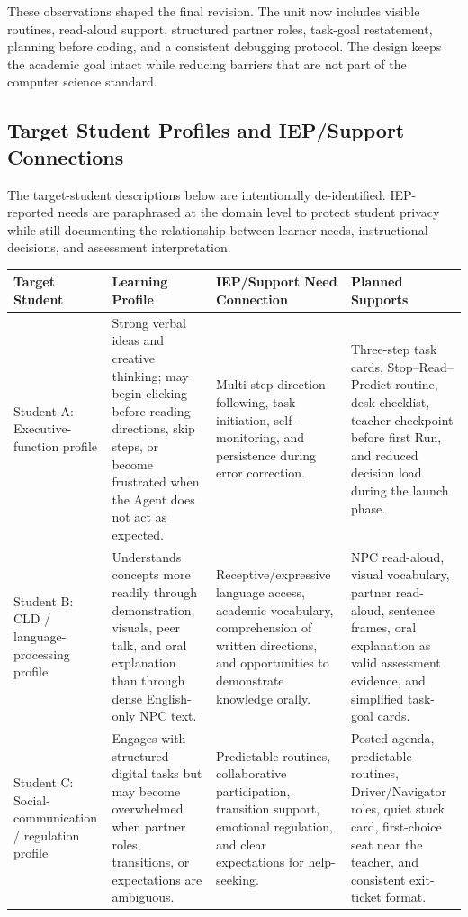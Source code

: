 \documentclass[12pt]{article}
\begin{document}
These observations shaped the final revision. The unit now includes visible routines, read-aloud support, structured partner roles, task-goal restatement, planning before coding, and a consistent debugging protocol. The design keeps the academic goal intact while reducing barriers that are not part of the computer science standard.

\subsection{Target Student Profiles and IEP/Support Connections}

The target-student descriptions below are intentionally de-identified. IEP-reported needs are paraphrased at the domain level to protect student privacy while still documenting the relationship between learner needs, instructional decisions, and assessment interpretation.

\newpage
\begin{xltabular}{\textwidth}{|P{1.15in}|P{1.65in}|P{1.65in}|L|}
\hline
{}\color{white}\bfseries Target Student & \color{white}\bfseries Learning Profile & \color{white}\bfseries IEP/Support Need Connection & \color{white}\bfseries Planned Supports \\
\hline
Student A: Executive-function profile & Strong verbal ideas and creative thinking; may begin clicking before reading directions, skip steps, or become frustrated when the Agent does not act as expected. & Multi-step direction following, task initiation, self-monitoring, and persistence during error correction. & Three-step task cards, Stop--Read--Predict routine, desk checklist, teacher checkpoint before first Run, and reduced decision load during the launch phase. \\
\hline
{} Student B: CLD / language-processing profile & Understands concepts more readily through demonstration, visuals, peer talk, and oral explanation than through dense English-only NPC text. & Receptive/expressive language access, academic vocabulary, comprehension of written directions, and opportunities to demonstrate knowledge orally. & NPC read-aloud, visual vocabulary, partner read-aloud, sentence frames, oral explanation as valid assessment evidence, and simplified task-goal cards. \\
\hline
Student C: Social-communication / regulation profile & Engages with structured digital tasks but may become overwhelmed when partner roles, transitions, or expectations are ambiguous. & Predictable routines, collaborative participation, transition support, emotional regulation, and clear expectations for help-seeking. & Posted agenda, predictable routines, Driver/Navigator roles, quiet stuck card, first-choice seat near the teacher, and consistent exit-ticket format. \\
\hline
\end{xltabular}
\end{document}

